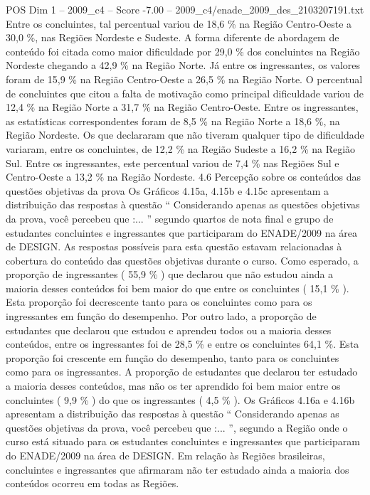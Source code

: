 \begin{textsample}{POS Dim 1 – 2009\_c4 – Score -7.00 – 2009\_c4/enade\_2009\_des\_2103207191.txt}
Entre os concluintes, tal percentual variou de 18,6 \% na Região Centro-Oeste a 30,0 \%, nas Regiões Nordeste e Sudeste.
A forma diferente de abordagem de conteúdo foi citada como maior dificuldade por 29,0 \% dos concluintes na Região Nordeste chegando a 42,9 \% na Região Norte.
Já entre os ingressantes, os valores foram de 15,9 \% na Região Centro-Oeste a 26,5 \% na Região Norte.
O percentual de concluintes que citou a falta de motivação como principal dificuldade variou de 12,4 \% na Região Norte a 31,7 \% na Região Centro-Oeste.
Entre os ingressantes, as estatísticas correspondentes foram de 8,5 \% na Região Norte a 18,6 \%, na Região Nordeste.
Os que declararam que não tiveram qualquer tipo de dificuldade variaram, entre os concluintes, de 12,2 \% na Região Sudeste a 16,2 \% na Região Sul.
Entre os ingressantes, este percentual variou de 7,4 \% nas Regiões Sul e Centro-Oeste a 13,2 \% na Região Nordeste. 4.6 Percepção sobre os conteúdos das questões objetivas da prova Os Gráficos 4.15a, 4.15b e 4.15c apresentam a distribuição das respostas à questão “ Considerando apenas as questões objetivas da prova, você percebeu que :... ” segundo quartos de nota final e grupo de estudantes concluintes e ingressantes que participaram do ENADE/2009 na área de DESIGN.
As respostas possíveis para esta questão estavam relacionadas à cobertura do conteúdo das questões objetivas durante o curso.
Como esperado, a proporção de ingressantes ( 55,9 \% ) que declarou que não estudou ainda a maioria desses conteúdos foi bem maior do que entre os concluintes ( 15,1 \% ).
Esta proporção foi decrescente tanto para os concluintes como para os ingressantes em função do desempenho.
Por outro lado, a proporção de estudantes que declarou que estudou e aprendeu todos ou a maioria desses conteúdos, entre os ingressantes foi de 28,5 \% e entre os concluintes 64,1 \%.
Esta proporção foi crescente em função do desempenho, tanto para os concluintes como para os ingressantes.
A proporção de estudantes que declarou ter estudado a maioria desses conteúdos, mas não os ter aprendido foi bem maior entre os concluintes ( 9,9 \% ) do que os ingressantes ( 4,5 \% ).
Os Gráficos 4.16a e 4.16b apresentam a distribuição das respostas à questão “ Considerando apenas as questões objetivas da prova, você percebeu que :... ”, segundo a Região onde o curso está situado para os estudantes concluintes e ingressantes que participaram do ENADE/2009 na área de DESIGN.
Em relação às Regiões brasileiras, concluintes e ingressantes que afirmaram não ter estudado ainda a maioria dos conteúdos ocorreu em todas as Regiões.

\end{textsample}
